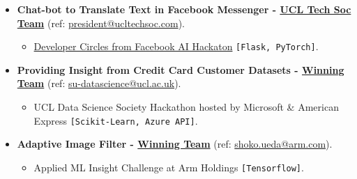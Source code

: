 \documentclass[10pt,a4paper,roman]{moderncv}
\begin{document}
{\begin{itemize}
\item\textbf{Chat-bot to Translate Text in Facebook Messenger - \href{http://ira-shokar.github.io/Photos/B49E08B8-030D-4969-BBD1-06179471A7C4.jpeg}{UCL Tech Soc Team}} (ref: \href{mailto:president@ucltechsoc.com}{president@ucltechsoc.com}). \textit{\enspace \enspace  \enspace  \enspace  \enspace  \enspace  \enspace \enspace  \enspace  \enspace \enspace \enspace  \enspace  \enspace  \enspace  \enspace  \enspace {}}
{\begin{itemize} \item \href{https://developers.facebook.com/developercircles/}{Developer Circles from Facebook AI Hackaton} \texttt{[Flask, PyTorch]}. \end{itemize}}
 
\item\textbf{Providing Insight from Credit Card Customer Datasets - \href{http://ira-shokar.github.io/Photos/BEC7A065-BDF4-49C7-8303-6C0FBF90B5F3.jpeg}{ Winning Team}} (ref: \href{mailto: su-datascience@ucl.ac.uk}{su-datascience@ucl.ac.uk}).  \textit{\enspace \enspace  \enspace  \enspace  \enspace  \enspace  \enspace \enspace  \enspace  \enspace \enspace \enspace  \enspace  \enspace  \enspace  \enspace  \enspace {}}
 {\begin{itemize} \item UCL Data Science Society Hackathon hosted by Microsoft \& American Express \texttt{[Scikit-Learn, Azure API]}. \end{itemize}}
 
\item\textbf{Adaptive Image Filter - \href{https://ira-shokar.github.io/Photos/14A514B1-8BB4-4882-97F3-03E2DE670639.jpeg}{ Winning Team}} (ref: \href{mailto: shoko.ueda@arm.com}{shoko.ueda@arm.com}). \textit{\enspace \enspace  \enspace  \enspace  \enspace  \enspace  \enspace \enspace  \enspace  \enspace \enspace \enspace  \enspace  \enspace  \enspace  \enspace  \enspace \enspace \enspace  \enspace  \enspace  \enspace  \enspace \enspace \enspace  \enspace  \enspace  \enspace  \enspace \enspace \enspace  \enspace  \enspace  \enspace  \enspace \enspace \enspace  \enspace  \enspace  \enspace  \enspace \enspace \enspace  \enspace  \enspace  \enspace  \enspace \enspace \enspace  \enspace  {}}
 {\begin{itemize} \item Applied ML Insight Challenge at Arm Holdings \texttt{[Tensorflow]}. \end{itemize}}
 

\end{itemize}}
\end{document}
